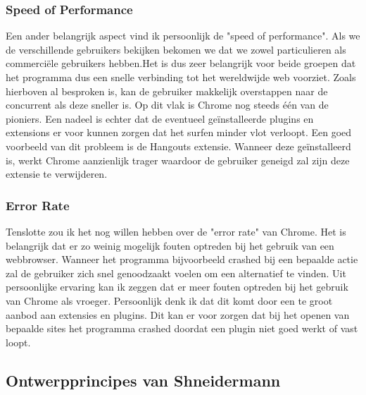 \documentclass[11pt]{article}
\begin{document}
\subsubsection{Speed of Performance}
Een ander belangrijk aspect vind ik persoonlijk de "speed of performance". Als we de verschillende gebruikers bekijken bekomen we dat we zowel particulieren als commerciële gebruikers hebben.Het is dus zeer belangrijk voor beide groepen dat het programma dus een snelle verbinding tot het wereldwijde web voorziet. Zoals hierboven al besproken is, kan de gebruiker makkelijk overstappen naar de concurrent als deze sneller is. Op dit vlak is Chrome nog steeds één van de pioniers. Een nadeel is echter dat de eventueel geïnstalleerde plugins en extensions er voor kunnen zorgen dat het surfen minder vlot verloopt. Een goed voorbeeld van dit probleem is de Hangouts extensie. Wanneer deze geïnstalleerd is, werkt Chrome aanzienlijk trager waardoor de gebruiker geneigd zal zijn deze extensie te verwijderen.
\subsubsection{Error Rate}
Tenslotte zou ik het nog willen hebben over de "error rate" van Chrome. Het is belangrijk dat er zo weinig mogelijk fouten optreden bij het gebruik van een webbrowser. Wanneer het programma bijvoorbeeld crashed bij een bepaalde actie zal de gebruiker zich snel genoodzaakt voelen om een alternatief te vinden. Uit persoonlijke ervaring kan ik zeggen dat er meer fouten optreden bij het gebruik van Chrome als vroeger. Persoonlijk denk ik dat dit komt door een te groot aanbod aan extensies en plugins. Dit kan er voor zorgen dat bij het openen van bepaalde sites het programma crashed doordat een plugin niet goed werkt of vast loopt.
\subsection{Ontwerpprincipes van Shneidermann}
\end{document}
